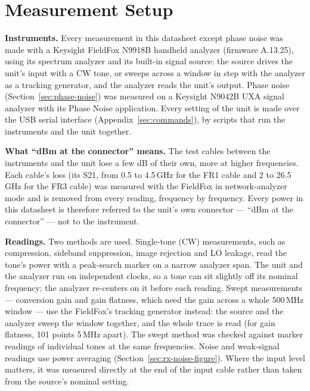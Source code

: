 \clearpage
\section{Measurement Setup}
\label{sec:setup}
\raggedbottom%

\textbf{Instruments.} Every measurement in this datasheet except phase noise was made with a Keysight FieldFox N9918B
handheld analyzer (firmware A.13.25), using its spectrum analyzer and its built-in signal source: the source drives
the unit's input with a CW tone, or sweeps across a window in step with the analyzer as a tracking generator, and
the analyzer reads the unit's output. Phase noise (Section~\ref{sec:phase-noise}) was measured on a Keysight N9042B
UXA signal analyzer with its Phase Noise application. Every setting of the unit is made over the USB serial interface
(Appendix~\ref{sec:commands}), by scripts that run the instruments and the unit together.

\textbf{What ``dBm at the connector'' means.} The test cables between the instruments and the unit lose a few dB of their
own, more at higher frequencies. Each cable's loss (its S21, from 0.5 to 4.5\,GHz for the FR1 cable and 2 to
26.5\,GHz for the FR3 cable) was measured with the FieldFox in network-analyzer mode and is removed from every
reading, frequency by frequency. Every power in this datasheet is therefore referred to the unit's own
connector --- ``dBm at the connector'' --- not to the instrument.

\textbf{Readings.} Two methods are used. Single-tone (CW) measurements, such as compression, sideband suppression,
image rejection and LO leakage, read the tone's power with a peak-search marker on a narrow analyzer span. The unit
and the analyzer run on independent clocks, so a tone can sit slightly off its nominal frequency; the analyzer
re-centers on it before each reading. Swept measurements --- conversion gain and gain flatness, which need the gain
across a whole 500\,MHz window --- use the FieldFox's tracking generator instead: the source and the analyzer sweep
the window together, and the whole trace is read (for gain flatness, 101 points 5\,MHz apart). The swept method was checked against
marker readings of individual tones at the same frequencies. Noise and weak-signal readings use power averaging
(Section~\ref{sec:rx-noise-figure}). Where the input level matters, it was measured directly at the end of the input
cable rather than taken from the source's nominal setting.

